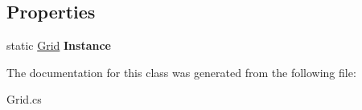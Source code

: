 \subsection*{Properties}
\begin{DoxyCompactItemize}
\item 
\mbox{\label{class_grid_ad1f5343530730e0088210d636be646ed}} 
static \hyperlink{class_grid}{Grid} {\bfseries Instance}
\end{DoxyCompactItemize}


The documentation for this class was generated from the following file\+:\begin{DoxyCompactItemize}
\item 
Grid.\+cs\end{DoxyCompactItemize}
